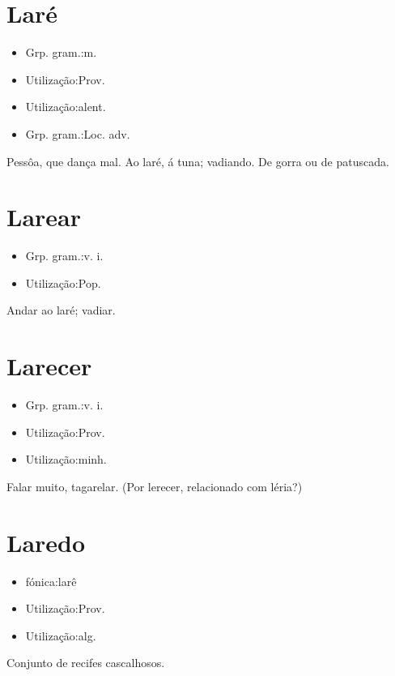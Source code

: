 \section{Laré}
\begin{itemize}
\item {Grp. gram.:m.}
\end{itemize}
\begin{itemize}
\item {Utilização:Prov.}
\end{itemize}
\begin{itemize}
\item {Utilização:alent.}
\end{itemize}
\begin{itemize}
\item {Grp. gram.:Loc. adv.}
\end{itemize}
Pessôa, que dança mal.
\textunderscore Ao laré\textunderscore , á tuna; vadiando.
De gorra ou de patuscada.
\section{Larear}
\begin{itemize}
\item {Grp. gram.:v. i.}
\end{itemize}
\begin{itemize}
\item {Utilização:Pop.}
\end{itemize}
Andar ao laré; vadiar.
\section{Larecer}
\begin{itemize}
\item {Grp. gram.:v. i.}
\end{itemize}
\begin{itemize}
\item {Utilização:Prov.}
\end{itemize}
\begin{itemize}
\item {Utilização:minh.}
\end{itemize}
Falar muito, tagarelar.
(Por \textunderscore lerecer\textunderscore , relacionado com \textunderscore léria\textunderscore ?)
\section{Laredo}
\begin{itemize}
\item {fónica:larê}
\end{itemize}
\begin{itemize}
\item {Utilização:Prov.}
\end{itemize}
\begin{itemize}
\item {Utilização:alg.}
\end{itemize}
Conjunto de recifes cascalhosos.
